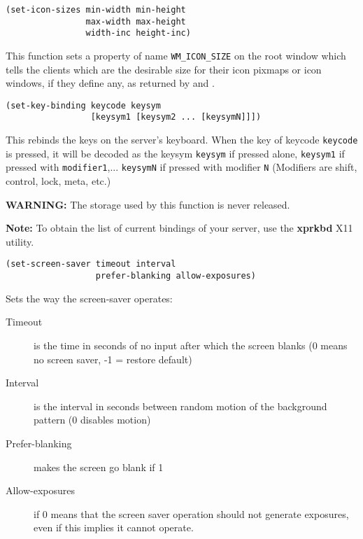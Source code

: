         
{\usagefont\begin{verbatim}
(set-icon-sizes min-width min-height
                max-width max-height
                width-inc height-inc)
\end{verbatim}}\usageupspace

This function sets a property of name \verb"WM_ICON_SIZE" on the root window
which tells the clients which are the desirable size for their icon pixmaps
or icon windows, if they define any, as returned by 
 and .

        
{\usagefont\begin{verbatim}
(set-key-binding keycode keysym 
                 [keysym1 [keysym2 ... [keysymN]]])
\end{verbatim}}\usageupspace

This rebinds the keys on the server's keyboard. When the key of keycode
\verb"keycode" is pressed, it will be decoded as the keysym
\verb"keysym" if pressed alone, \verb"keysym1" if pressed with
\verb"modifier1",...  \verb"keysymN" if pressed with modifier {\tt N}
(Modifiers are shift, control, lock, meta, etc.)

{\bf WARNING:} The storage used by this function is never released.

{\bf Note:} To obtain the list of current bindings of your server, use the
{\bf xprkbd} X11 utility.

        
{\usagefont\begin{verbatim}
(set-screen-saver timeout interval 
                  prefer-blanking allow-exposures)
\end{verbatim}}\usageupspace

Sets the way the screen-saver operates:

\begin{description}

\item[Timeout] is the time in seconds of no input after which the screen blanks
                (0 means no screen saver, -1 = restore default)
\item[Interval] is the interval in seconds between random motion of the background
                pattern (0 disables motion)
\item[Prefer-blanking] makes the screen go blank if 1
\item[Allow-exposures] if 0 means that the screen saver operation should not
                generate exposures, even if this implies it cannot operate.
\end{description}

